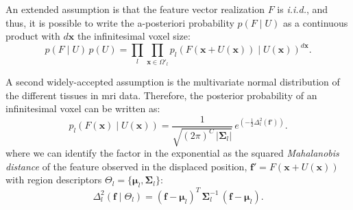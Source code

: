 An extended assumption is that the feature vector realization $F$ is
\emph{i.i.d.}, and thus, it is possible to write the a-posteriori
probability $p(F \mid U)$ as a continuous product with $d\mathbf{x}$ the
infinitesimal voxel size:
\begin{equation}
p(F \mid U) \, p(U) = \underset{l}{\prod} \underset{\mathbf{x}\in \Omega'_l}{\prod}
p_l\left( F(\mathbf{x} + U(\mathbf{x})) \mid U(\mathbf{x}) \right)^{d\mathbf{x}}.
\label{eq:bayes_aposteriori}
\end{equation}

A second widely-accepted assumption is the multivariate normal 
distribution of the different tissues in \gls{mri} data. Therefore,
the posterior probability of an infinitesimal voxel can be written as:
\begin{equation}
p_l( F(\mathbf{x}) \mid U(\mathbf{x}) ) = \frac{1}{ \sqrt{(2\pi)^{C}\,\left|\boldsymbol{\Sigma}_{l}\right|}}\,{e^{\left(-\frac{1}{2}  \Delta^2_l (\mathbf{f}') \right)}}.
\label{eq:bayes_mpdf}
\end{equation}
where we can identify the factor in the exponential as the squared \emph{Mahalanobis 
distance} of the feature observed in the displaced position, $\mathbf{f}' = 
F(\mathbf{x} + U(\mathbf{x}))$ with region descriptors
$\Theta_l = \lbrace \boldsymbol{\mu}_l, \boldsymbol{\Sigma}_l \rbrace$:
\begin{equation}
\Delta^2_l (\mathbf{f} \mid \Theta_l ) = (\mathbf{f} - \boldsymbol{\mu}_l)^T \, \boldsymbol{\Sigma}^{-1}_l \, (\mathbf{f} - \boldsymbol{\mu}_l).
\label{eq:bayes_mahalanobis}
\end{equation}

